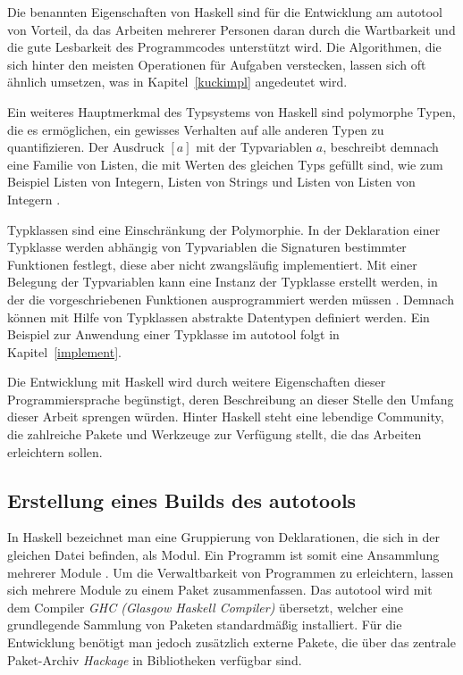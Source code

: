Die benannten Eigenschaften von Haskell sind für die Entwicklung am autotool von Vorteil, da das Arbeiten mehrerer Personen daran durch die Wartbarkeit und die gute Lesbarkeit des Programmcodes unterstützt wird. Die Algorithmen, die sich hinter den meisten Operationen für Aufgaben verstecken, lassen sich oft ähnlich umsetzen, was in Kapitel~\ref{kuckimpl} angedeutet wird.

Ein weiteres Hauptmerkmal des Typsystems von Haskell sind polymorphe Typen, die es ermöglichen, ein gewisses Verhalten auf alle anderen Typen zu quantifizieren. Der Ausdruck \([a]\) mit der Typvariablen \(a\), beschreibt demnach eine Familie von Listen, die mit Werten des gleichen Typs gefüllt sind, wie zum Beispiel Listen von Integern, Listen von Strings und Listen von Listen von Integern \cite[ch.~2]{ATgentle}. 

Typklassen sind eine Einschränkung der Polymorphie. In der Deklaration einer Typklasse werden abhängig von Typvariablen die Signaturen bestimmter Funktionen festlegt, diese aber nicht zwangsläufig implementiert. Mit einer Belegung der Typvariablen kann eine Instanz der Typklasse erstellt werden, in der die vorgeschriebenen Funktionen ausprogrammiert werden müssen \cite[ch.~5]{ATgentle}. Demnach können mit Hilfe von Typklassen abstrakte Datentypen definiert werden. Ein Beispiel zur Anwendung einer Typklasse im autotool folgt in Kapitel~\ref{implement}. 

Die Entwicklung mit Haskell wird durch weitere Eigenschaften dieser Programmiersprache begünstigt, deren Beschreibung an dieser Stelle den Umfang dieser Arbeit sprengen würden. Hinter Haskell steht eine lebendige Community, die zahlreiche Pakete und Werkzeuge zur Verfügung stellt, die das Arbeiten erleichtern sollen.

\subsection{Erstellung eines Builds des autotools}
In Haskell bezeichnet man eine Gruppierung von Deklarationen, die sich in der gleichen Datei befinden, als Modul. Ein Programm ist somit eine Ansammlung mehrerer Module \cite[ch.~11]{ATgentle}. Um die Verwaltbarkeit von Programmen zu erleichtern, lassen sich mehrere Module zu einem Paket zusammenfassen. Das autotool wird mit dem Compiler \textit{GHC (Glasgow Haskell Compiler)} \cite{ghc} übersetzt, welcher eine grundlegende Sammlung von Paketen standardmäßig installiert. Für die Entwicklung benötigt man jedoch zusätzlich externe Pakete, die über das zentrale Paket-Archiv \textit{Hackage} \cite{hackage} in Bibliotheken verfügbar sind.

